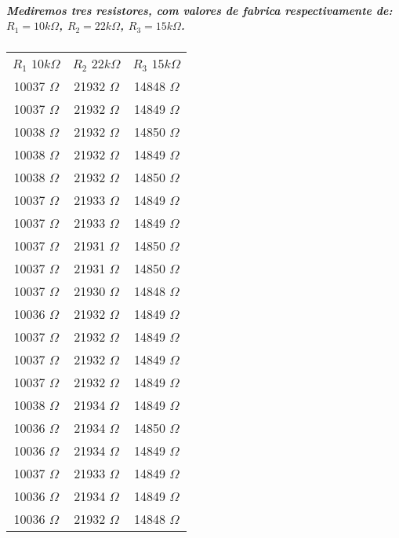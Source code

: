 \documentclass[12pt,twoside, a4paper, twocolumn]{article}
\begin{document}
\subparagraph*{Mediremos tres resistores, com valores de fabrica respectivamente de: $R_1 = 10k \varOmega$, $R_2 = 22k \varOmega$, $R_3 = 15k \varOmega$.}
\begin{center}
    \begin{tabular}{ |c|c|c| }
        \hline
        $R_1$ $10k\varOmega$ & $R_2$ $22k\varOmega$ & $R_3$ $15k\varOmega$ \\
        10037 $\varOmega$    & 21932 $\varOmega$    & 14848 $\varOmega$    \\
        10037 $\varOmega$    & 21932 $\varOmega$    & 14849 $\varOmega$    \\
        10038 $\varOmega$    & 21932 $\varOmega$    & 14850 $\varOmega$    \\
        10038 $\varOmega$    & 21932 $\varOmega$    & 14849 $\varOmega$    \\
        10038 $\varOmega$    & 21932 $\varOmega$    & 14850 $\varOmega$    \\
        10037 $\varOmega$    & 21933 $\varOmega$    & 14849 $\varOmega$    \\
        10037 $\varOmega$    & 21933 $\varOmega$    & 14849 $\varOmega$    \\
        10037 $\varOmega$    & 21931 $\varOmega$    & 14850 $\varOmega$    \\
        10037 $\varOmega$    & 21931 $\varOmega$    & 14850 $\varOmega$    \\
        10037 $\varOmega$    & 21930 $\varOmega$    & 14848 $\varOmega$    \\
        10036 $\varOmega$    & 21932 $\varOmega$    & 14849 $\varOmega$    \\
        10037 $\varOmega$    & 21932 $\varOmega$    & 14849 $\varOmega$    \\
        10037 $\varOmega$    & 21932 $\varOmega$    & 14849 $\varOmega$    \\
        10037 $\varOmega$    & 21932 $\varOmega$    & 14849 $\varOmega$    \\
        10038 $\varOmega$    & 21934 $\varOmega$    & 14849 $\varOmega$    \\
        10036 $\varOmega$    & 21934 $\varOmega$    & 14850 $\varOmega$    \\
        10036 $\varOmega$    & 21934 $\varOmega$    & 14849 $\varOmega$    \\
        10037 $\varOmega$    & 21933 $\varOmega$    & 14849 $\varOmega$    \\
        10036 $\varOmega$    & 21934 $\varOmega$    & 14849 $\varOmega$    \\
        10036 $\varOmega$    & 21932 $\varOmega$    & 14848 $\varOmega$    \\

        \hline
    \end{tabular}
\end{center}
\end{document}
